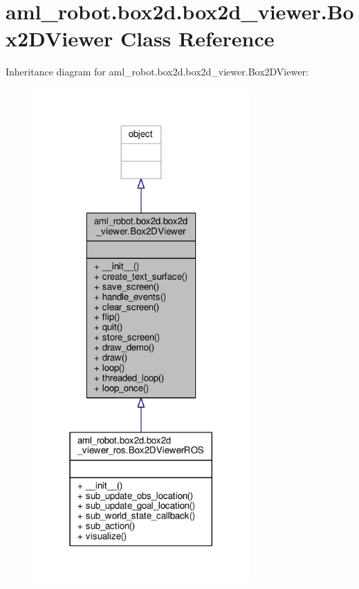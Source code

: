 \hypertarget{classaml__robot_1_1box2d_1_1box2d__viewer_1_1_box2_d_viewer}{\section{aml\-\_\-robot.\-box2d.\-box2d\-\_\-viewer.\-Box2\-D\-Viewer Class Reference}
\label{classaml__robot_1_1box2d_1_1box2d__viewer_1_1_box2_d_viewer}
}


Inheritance diagram for aml\-\_\-robot.\-box2d.\-box2d\-\_\-viewer.\-Box2\-D\-Viewer\-:
\nopagebreak
\begin{figure}[H]
\begin{center}
\leavevmode
\includegraphics[width=234pt]{classaml__robot_1_1box2d_1_1box2d__viewer_1_1_box2_d_viewer__inherit__graph}
\end{center}
\end{figure}


